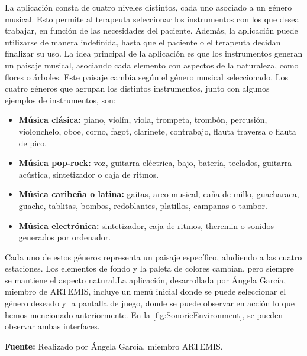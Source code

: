 La aplicación consta de cuatro niveles distintos, cada uno asociado a un género musical. Esto permite al terapeuta seleccionar los instrumentos con los que desea trabajar, en función de las necesidades del paciente. Además, la aplicación puede utilizarse de manera indefinida, hasta que el paciente o el terapeuta decidan finalizar su uso. La idea principal de la aplicación es que los instrumentos generan un paisaje musical, asociando cada elemento con aspectos de la naturaleza, como flores o árboles. Este paisaje cambia según el género musical seleccionado. Los cuatro géneros que agrupan los distintos instrumentos, junto con algunos ejemplos de instrumentos, son:

\begin{itemize}
	\item \textbf{Música clásica:} piano, violín, viola, trompeta, trombón, percusión, violonchelo, oboe, corno, fagot, clarinete, contrabajo, flauta traversa o flauta de pico.
	\item \textbf{Música pop-rock:} voz, guitarra eléctrica, bajo, batería, teclados, guitarra acústica, sintetizador o caja de ritmos.
	\item \textbf{Música caribeña o latina:} gaitas, arco musical, caña de millo, guacharaca, guache, tablitas, bombos, redoblantes, platillos, campanas o tambor.
	\item \textbf{Música electrónica:} sintetizador, caja de ritmos, theremin o sonidos generados por ordenador.
\end{itemize}

Cada uno de estos géneros representa un paisaje específico, aludiendo a las cuatro estaciones. Los elementos de fondo y la paleta de colores cambian, pero siempre se mantiene el aspecto natural.La aplicación, desarrollada por Ángela García, miembro de ARTEMIS, incluye un menú inicial donde se puede seleccionar el género deseado y la pantalla de juego, donde se puede observar en acción lo que hemos mencionado anteriormente. En la \autoref{fig:SonoricEnvironment}, se pueden observar ambas interfaces.

\begin{center}
	\textbf{Fuente:} Realizado por Ángela García, miembro ARTEMIS.
	\vspace{-18pt}
\end{center}

